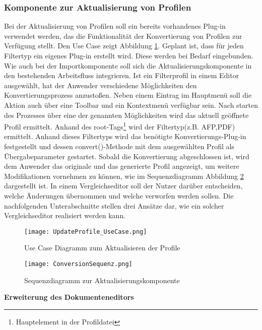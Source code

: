 {{\subsubsection{Komponente zur Aktualisierung von Profilen}{
Bei der Aktualisierung von Profilen soll ein bereits vorhandenes Plug-in verwendet werden, das die Funktionalität der Konvertierung von Profilen zur Verfügung stellt. Den Use Case zeigt Abbildung \ref{fig:UpdateProfile_UseCase}. Geplant ist, dass für jeden Filtertyp ein eigenes Plug-in erstellt wird. Diese werden bei Bedarf eingebunden. Wie auch bei der Importkomponente soll sich die Aktualisierungskomponente in den bestehenden Arbeitsfluss integrieren. Ist ein Filterprofil in einem Editor ausgewählt, hat der Anwender verschiedene Möglichkeiten den Konvertierungsprozess anzustoßen. Neben einem Eintrag im Hauptmenü soll die Aktion auch über eine \gls{Toolbar} und ein Kontextmenü verfügbar sein. Nach starten des Prozesses über eine der genannten Möglichkeiten wird das aktuell geöffnete Profil ermittelt. Anhand des root-Tags\footnote{Hauptelement in der Profildatei} wird der Filtertyp(z.B. \ac{AFP},\ac{PDF}) ermittelt. Anhand dieses Filtertyps wird das benötigte Konvertierungs-Plug-in festgestellt und dessen convert()-Methode mit dem ausgewählten Profil als Übergabeparameter gestartet. Sobald die Konvertierung abgeschlossen ist, wird dem Anwender das originale und das generierte Profil angezeigt, um weitere Modifikationen vornehmen zu können, wie im Sequenzdiagramm Abbildung \ref{fig:ConversionSequenz} dargestellt ist. 
In einem Vergleichseditor soll der Nutzer darüber entscheiden, welche Änderungen übernommen und welche verworfen werden sollen. Die nachfolgenden Unterabschnitte stellen drei Ansätze dar, wie ein solcher Vergleichseditor realisiert werden kann.


\begin{figure}[H] 
  \centering
     \texttt{[image: UpdateProfile\_UseCase.png]}
  \caption{Use Case Diagramm zum Aktualisieren der Profile}
  \label{fig:UpdateProfile_UseCase}
\end{figure}

\begin{figure}[H] 
  \centering
     \texttt{[image: ConversionSequenz.png]}
  \caption{Sequenzdiagramm zur Aktualisierungskomponente}
  \label{fig:ConversionSequenz}
\end{figure}






\textbf{Erweiterung des Dokumenteneditors}{

}}}}
